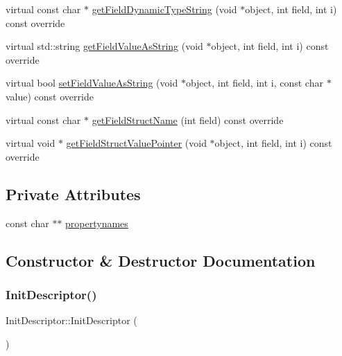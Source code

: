 \begin{DoxyCompactItemize}
\item 
virtual const char $\ast$ \hyperlink{class_init_descriptor_a93d85a84c15e095b2eb7b39b2b392837}{get\+Field\+Dynamic\+Type\+String} (void $\ast$object, int field, int i) const override
\item 
virtual std\+::string \hyperlink{class_init_descriptor_a94c8aa0ca2f12dff66033c5320e944bb}{get\+Field\+Value\+As\+String} (void $\ast$object, int field, int i) const override
\item 
virtual bool \hyperlink{class_init_descriptor_af57482db7fb146d3da8b790900a3f96e}{set\+Field\+Value\+As\+String} (void $\ast$object, int field, int i, const char $\ast$value) const override
\item 
virtual const char $\ast$ \hyperlink{class_init_descriptor_a13c89c76ac3273c48418e94eab1c88b0}{get\+Field\+Struct\+Name} (int field) const override
\item 
virtual void $\ast$ \hyperlink{class_init_descriptor_a40bdb3ccca5709afd21ab2a2bf12b5e0}{get\+Field\+Struct\+Value\+Pointer} (void $\ast$object, int field, int i) const override
\end{DoxyCompactItemize}
\subsection*{Private Attributes}
\begin{DoxyCompactItemize}
\item 
const char $\ast$$\ast$ \hyperlink{class_init_descriptor_a070498d1650ac65184f35f6449f7cd5d}{propertynames}
\end{DoxyCompactItemize}


\subsection{Constructor \& Destructor Documentation}
\mbox{\label{class_init_descriptor_ab339ad8c646e3ebd54fca1d423669bcc}} 
\subsubsection{\texorpdfstring{Init\+Descriptor()}{InitDescriptor()}}
{\footnotesize\ttfamily Init\+Descriptor\+::\+Init\+Descriptor (\begin{DoxyParamCaption}{ }\end{DoxyParamCaption})}


